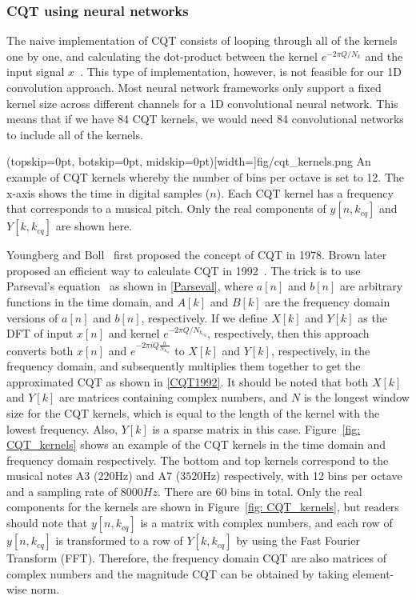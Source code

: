 \documentclass{ieeeaccess}
\begin{document}
\subsubsection{CQT using neural networks}
The naive implementation of CQT consists of looping through all of the kernels one by one, and calculating the dot-product between the kernel $e^{-2\pi Q/N_k}$ and the input signal $x$~\cite{brown1991calculation}. This type of implementation, however, is not feasible for our 1D convolution approach. Most neural network frameworks only support a fixed kernel size across different channels for a 1D convolutional neural network. This means that if we have 84 CQT kernels, we would need 84 convolutional networks to include all of the kernels.


\Figure[h](topskip=0pt, botskip=0pt, midskip=0pt)[width=\linewidth]{fig/cqt_kernels.png}
{An example of CQT kernels whereby the number of bins per octave is set to 12. The x-axis shows the time in digital samples ($n$). Each CQT kernel has a frequency that corresponds to a musical pitch. Only the real components of $y[n, k_{cq}]$ and $Y[k, k_{cq}]$ are shown here.  \label{fig: CQT_kernels}}

Youngberg and Boll~\cite{youngberg1978constant} first proposed the concept of CQT in 1978. Brown later proposed an efficient way to calculate CQT in 1992~\cite{brown1992efficient}. The trick is to use Parseval's equation~\cite{Oppenheim1989DiscretetimeSP} as shown in \eqref{Parseval}, where $a[n]$ and $b[n]$ are arbitrary functions in the time domain, and $A[k]$ and $B[k]$ are the frequency domain versions of $a[n]$ and $b[n]$, respectively. If we define $X[k]$ and $Y[k]$ as the DFT of input $x[n]$ and kernel $e^{-2\pi Q/N_{k_{cq}}}$, respectively, then this approach converts both $x[n]$ and $e^{-2\pi iQ\frac{n}{N_{k_{cq}}}}$ to $X[k]$ and $Y[k]$, respectively, in the frequency domain, and subsequently multiplies them together to get the approximated CQT as shown in \eqref{CQT1992}. It should be noted that both $X[k]$ and $Y[k]$ are  matrices containing complex numbers, and $N$ is the longest window size for the CQT kernels, which is equal to the length of the kernel with the lowest frequency. Also, $Y[k]$ is a sparse matrix in this case. Figure~\ref{fig: CQT_kernels} shows an example of the CQT kernels in the time domain and frequency domain respectively. The bottom and top kernels correspond to the musical notes A3 ($220$Hz) and A7 ($3520$Hz) respectively, with 12 bins per octave and a sampling rate of $8000Hz$. There are 60 bins in total. Only the real components for the kernels are shown in Figure~\ref{fig: CQT_kernels}, but readers should note that $y[n,k_{cq}]$ is a matrix with complex numbers, and each row of $y[n,k_{cq}]$ is transformed to a row of $Y[k,k_{cq}]$ by using the Fast Fourier Transform (FFT). Therefore, the frequency domain CQT are also matrices of complex numbers and the magnitude CQT can be obtained by taking element-wise norm.
\end{document}
